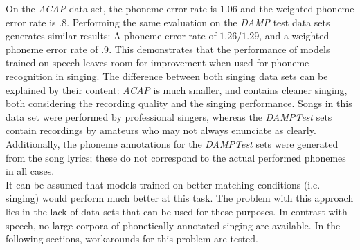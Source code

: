 On the \textit{ACAP} data set, the phoneme error rate is $1.06$ and the weighted phoneme error rate is $.8$. Performing the same evaluation on the \textit{DAMP} test data sets generates similar results: A phoneme error rate of $1.26$/$1.29$, and a weighted phoneme error rate of $.9$. This demonstrates that the performance of models trained on speech leaves room for improvement when used for phoneme recognition in singing. The difference between both singing data sets can be explained by their content: \textit{ACAP} is much smaller, and contains cleaner singing, both considering the recording quality and the singing performance. Songs in this data set were performed by professional singers, whereas the \textit{DAMPTest} sets contain recordings by amateurs who may not always enunciate as clearly. Additionally, the phoneme annotations for the \textit{DAMPTest} sets were generated from the song lyrics; these do not correspond to the actual performed phonemes in all cases.\\
It can be assumed that models trained on better-matching conditions (i.e. singing) would perform much better at this task. The problem with this approach lies in the lack of data sets that can be used for these purposes. In contrast with speech, no large corpora of phonetically annotated singing are available. In the following sections, workarounds for this problem are tested.

